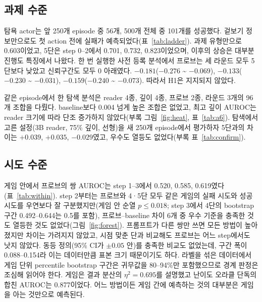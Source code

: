 \documentclass[10pt]{article}
\begin{document}
\subsection{과제 수준}\label{sec:task}
탐욕 actor는 앞 250개 episode 중 56개, 500개 전체 중 101개를 성공했다. 겉보기 정보만으로도 첫 action 전에 실패가 예측되었다(표~\ref{tab:ladder}). 과제 유형만으로 0.603이었고, 5단은 step 0--2에서 0.701, 0.732, 0.823이었으며, 이후의 상승은 대부분 진행도 특징에서 나왔다.
한 번 실행한 사전 등록 분석에서 프로브는 세 라운드 모두 5단보다 낮았고 신뢰구간도 모두 0 아래였다. $-0.181$($-0.276$ \textasciitilde{} $-0.069$), $-0.133$($-0.230$ \textasciitilde{} $-0.031$), $-0.159$($-0.240$ \textasciitilde{} $-0.073$). 따라서 H1은 지지되지 않았다.



같은 episode에서 한 탐색 분석은 reader 4종, 깊이 4종, 프로브 2종, 라운드 3개의 96개 조합을 다뤘다. baseline보다 0.004 넘게 높은 조합은 없었고, 최고 깊이 AUROC는 reader 크기에 따라 단조 증가하지 않았다(부록 그림~\ref{fig:heat}, 표~\ref{tab:a6}).
탐색에서 고른 설정(3B reader, 75\% 깊이, 선형)을 새 250개 episode에서 평가하자 5단과의 차이는 $+0.039$, $+0.035$, $-0.029$였고, 우수도 열등도 없었다(부록 표~\ref{tab:confirm}).

\subsection{시도 수준}\label{sec:attempt}
게임 안에서 프로브의 쌍 AUROC는 step 1--3에서 0.520, 0.585, 0.619였다(표~\ref{tab:within}). step 2부터는 프로브와 4·5단 모두 같은 게임의 실패 시도와 성공 시도를 우연보다 잘 구분했지만(게임 안 순열 $p \le 0.018$; step 3에서 4단의 bootstrap 구간 0.492--0.644는 0.5를 포함),
프로브--baseline 차이 6개 중 우수 기준을 충족한 것도 열등한 것도 없었다(그림~\ref{fig:forest}). 프롬프트가 다른 쌍만 쓰면 모든 방법이 높아졌지만 차이는 가려지지 않았고, 시점 맞춘 단과 비교해도 프로브는 어느 step에서도 낫지 않았다.
동등 정의(95\% CI가 $\pm 0.05$ 안)를 충족한 비교도 없었는데, 구간 폭이 0.088--0.154라 이는 데이터만큼 표본 크기 때문이기도 하다. 라벨을 섞은 데이터에서 게임 단위 percentile bootstrap 구간은 귀무값을 80--94\%만 포함했으므로 경계 판정은 조심해 읽어야 한다.
게임은 결과 분산의 $\eta^2 = 0.695$를 설명했고 난이도 오라클 단독의 합친 AUROC는 0.877이었다. 어느 방법이든 게임 간에 예측하는 것의 대부분은 게임을 아는 것만으로 예측된다.



\end{document}
